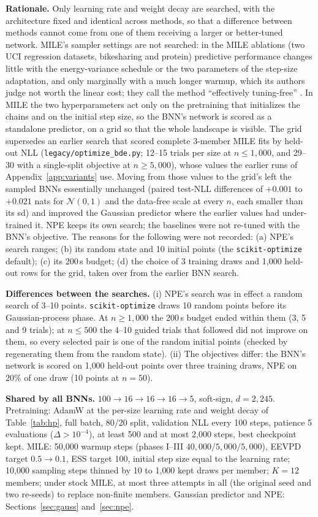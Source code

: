 \documentclass[11pt]{article}
\newcommand{\nzo}{\mathcal{N}(0,1)}
\newcommand{\code}[1]{\texttt{#1}}
\begin{document}
\textbf{Rationale.} Only learning rate and weight decay are searched, with the architecture fixed and
identical across methods, so that a difference between methods cannot come from one of them receiving a
larger or better-tuned network. MILE's sampler settings are not searched: in the MILE ablations (two UCI
regression datasets, bikesharing and protein) predictive performance changes little with the energy-variance schedule or the two
parameters of the step-size adaptation, and only marginally with a much longer warmup, which its authors
judge not worth the linear cost; they call the method ``effectively tuning-free'' \citep{sommer2025mile}. In MILE the
two hyperparameters act only on the pretraining that initializes the chains and on the initial step size, so the
BNN's network is scored as a standalone predictor, on a grid so that the whole landscape is visible. The grid
supersedes an earlier search that scored complete 3-member MILE fits by held-out NLL (\code{legacy/optimize\_bde.py};
12--15 trials per size at $n\le1{,}000$, and 29--30 with a single-split objective at $n\ge5{,}000$), whose values the
earlier runs of Appendix~\ref{app:variants} use. Moving from those values to the grid's left the sampled BNNs
essentially unchanged (paired test-NLL differences of $+0.001$ to $+0.021$ nats for $\nzo$ and the data-free scale at
every $n$, each smaller than its sd) and improved the Gaussian predictor where the earlier values had under-trained it.
NPE keeps its own search; the baselines were not re-tuned with the BNN's objective. The reasons for the following were
not recorded: (a) NPE's search ranges; (b) its random state and 10 initial points (the \code{scikit-optimize} default);
(c) its 200\,s budget; (d) the choice of 3 training draws and 1{,}000 held-out rows for the grid, taken over from the
earlier BNN search.

\textbf{Differences between the searches.} (i) NPE's search was in effect a random search of 3--10 points.
\code{scikit-optimize} draws 10 random points before its Gaussian-process phase. At $n\ge1{,}000$ the 200\,s budget
ended within them (3, 5 and 9 trials); at $n\le500$ the 4--10 guided trials that followed did not improve on them, so
every selected pair is one of the random initial points (checked by regenerating them from the random state). (ii) The objectives differ: the BNN's network is scored on 1{,}000
held-out points over three training draws, NPE on 20\% of one draw (10 points at $n=50$).

\textbf{Shared by all BNNs.} $100\to16\to16\to16\to5$, soft-sign, $d=2{,}245$. Pretraining: AdamW at the per-size
learning rate and weight decay of Table~\ref{tab:hp}, full batch, 80/20 split, validation NLL every 100 steps,
patience 5 evaluations ($\Delta>10^{-4}$), at least 500 and at most 2{,}000 steps, best checkpoint kept.
MILE: 50{,}000 warmup steps (phases I--III $40{,}000/5{,}000/5{,}000$), EEVPD target $0.5\to0.1$, ESS target 100,
initial step size equal to the learning rate; 10{,}000 sampling steps thinned by 10 to 1{,}000 kept draws per
member; $K=12$ members; under stock MILE, at most three attempts in all (the original seed and two re-seeds) to
replace non-finite members. Gaussian
predictor and NPE: Sections~\ref{sec:gauss} and~\ref{sec:npe}.
\end{document}
